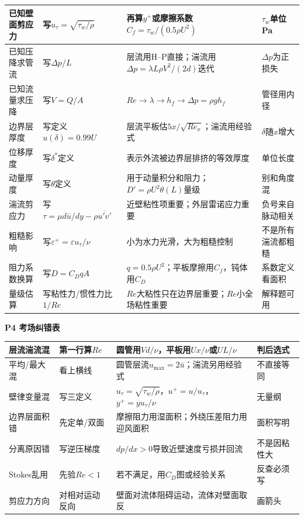 \documentclass[UTF8,a4paper]{ctexart}
\newcommand{\ftitle}[1]{\vspace{1pt}\textbf{\textcolor{B}{#1}}\par\vspace{0.5pt}}
\begin{document}
\begin{tabular}{|L{0.19\textwidth}|L{0.23\textwidth}|L{0.34\textwidth}|L{0.19\textwidth}|}\hline
已知壁面剪应力 & 写$u_\tau=\sqrt{\tau_w/\rho}$ & 再算$y^+$或摩擦系数$C_f=\tau_w/(0.5\rho U^2)$ & $\tau_w$单位Pa \\\hline
已知压降求管流 & 写$\Delta p/L$ & 层流用H--P直接；湍流用$\Delta p=\lambda L\rho V^2/(2d)$迭代 & $\Delta p$为正损失 \\\hline
已知流量求压降 & 写$V=Q/A$ & $Re\to\lambda\to h_f\to\Delta p=\rho gh_f$ & 管径用内径 \\\hline
边界层厚度 & 写定义$u(\delta)=0.99U$ & 层流平板估$5x/\sqrt{Re_x}$；湍流用经验式 & $\delta$随$x$增大 \\\hline
位移厚度 & 写$\delta^*$定义 & 表示外流被边界层排挤的等效厚度 & 单位长度 \\\hline
动量厚度 & 写$\theta$定义 & 用于动量积分和阻力；$D'=\rho U^2\theta(L)$量级 & 别和角度混 \\\hline
湍流剪应力 & 写$\tau=\mu d\bar u/dy-\rho\overline{u'v'}$ & 近壁粘性项重要；外层雷诺应力重要 & 负号来自脉动相关 \\\hline
粗糙影响 & 写$\varepsilon^+=\varepsilon u_\tau/\nu$ & 小为水力光滑，大为粗糙控制 & 不是所有湍流都粗糙 \\\hline
阻力系数换算 & 写$D=C_DqA$ & $q=0.5\rho U^2$；平板摩擦用$C_f$，钝体用$C_D$ & 系数定义看面积 \\\hline
量级估算 & 写粘性力/惯性力比$1/Re$ & $Re$大粘性只在边界层重要；$Re$小全场粘性重要 & 解释题可用 \\\hline
\end{tabular}
\ftitle{P4 考场纠错表}
\begin{tabular}{|L{0.22\textwidth}|L{0.25\textwidth}|L{0.33\textwidth}|L{0.15\textwidth}|}\hline
层流湍流混 & 第一行算$Re$ & 圆管用$Vd/\nu$，平板用$Ux/\nu$或$UL/\nu$ & 判后选式 \\\hline
平均/最大混 & 看上横线 & 圆管层流$u_{\max}=2\bar u$；湍流另用经验式 & 不直接等同 \\\hline
壁律变量混 & 写三定义 & $u_\tau=\sqrt{\tau_w/\rho}$，$u^+=u/u_\tau$，$y^+=yu_\tau/\nu$ & 无量纲 \\\hline
边界层面积错 & 先定单/双面 & 摩擦阻力用湿面积；外绕压差阻力用迎风面积 & 面积写明 \\\hline
分离原因错 & 写逆压梯度 & $dp/dx>0$导致近壁速度亏损并回流 & 不是因粘性大 \\\hline
Stokes乱用 & 先验$Re<1$ & 若不满足，用$C_D$图或经验关系 & 反查必须写 \\\hline
剪应力方向 & 对相对运动反向 & 壁面对流体阻碍运动，流体对壁面取反 & 画箭头 \\\hline
\end{tabular}
\end{document}
